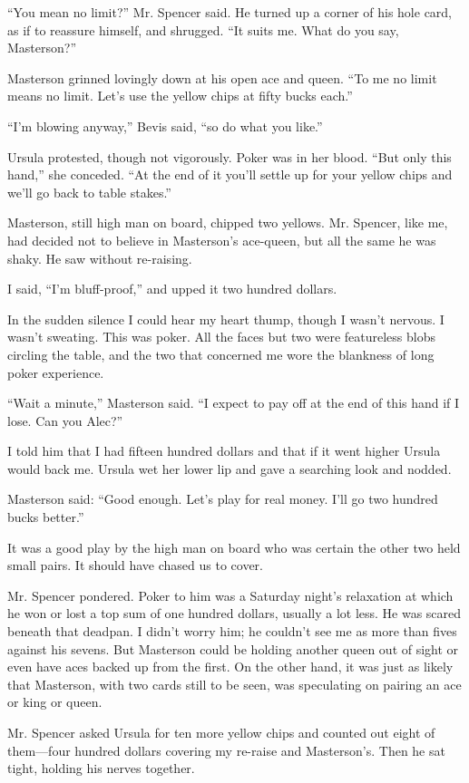 \documentclass{novel}
\begin{document}
{“You mean no limit?” Mr. Spencer said. He turned up a corner of his hole card, as if to reassure himself, and shrugged. “It suits me. What do you say, Masterson?”

Masterson grinned lovingly down at his open ace and queen. “To me no limit means no limit. Let’s use the yellow chips at fifty bucks each.”

“I’m blowing anyway,” Bevis said, “so do what you like.”

Ursula protested, though not vigorously. Poker was in her blood. “But only this hand,” she conceded. “At the end of it you’ll settle up for your yellow chips and we’ll go back to table stakes.”

Masterson, still high man on board, chipped two yellows. Mr. Spencer, like me, had decided not to believe in Masterson’s ace-queen, but all the same he was shaky. He saw without re-raising.

I said, “I’m bluff-proof,” and upped it two hundred dollars.

In the sudden silence I could hear my heart thump, though I wasn’t nervous. I wasn’t sweating. This was poker. All the faces but two were featureless blobs circling the table, and the two that concerned me wore the blankness of long poker experience.

“Wait a minute,” Masterson said. “I expect to pay off at the end of this hand if I lose. Can you Alec?”

I told him that I had fifteen hundred dollars and that if it went higher Ursula would back me. Ursula wet her lower lip and gave a searching look and nodded.

Masterson said: “Good enough. Let’s play for real money. I’ll go two hundred bucks better.”

It was a good play by the high man on board who was certain the other two held small pairs. It should have chased us to cover.

Mr. Spencer pondered. Poker to him was a Saturday night’s relaxation at which he won or lost a top sum of one hundred dollars, usually a lot less. He was scared beneath that deadpan. I didn’t worry him; he couldn’t see me as more than fives against his sevens. But Masterson could be holding another queen out of sight or even have aces backed up from the first. On the other hand, it was just as likely that Masterson, with two cards still to be seen, was speculating on pairing an ace or king or queen.

Mr. Spencer asked Ursula for ten more yellow chips and counted out eight of them—four hundred dollars covering my re-raise and Masterson’s. Then he sat tight, holding his nerves together.

}
\end{document}
